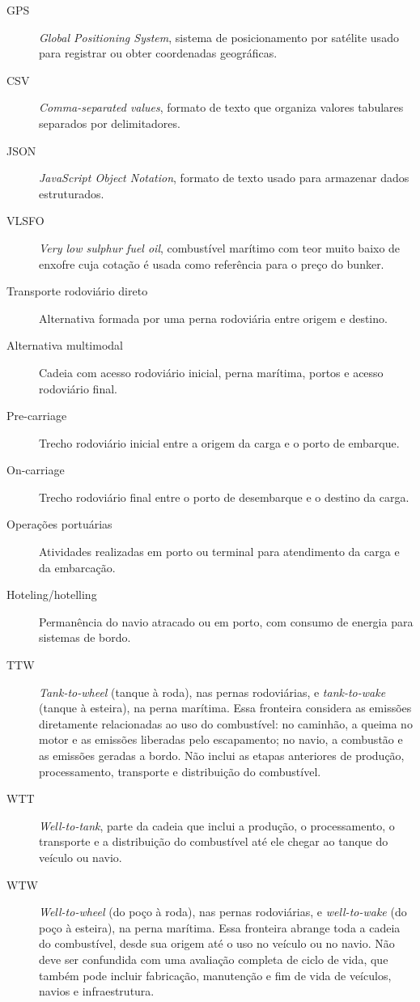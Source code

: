 \documentclass[12pt,a4paper,oneside]{report}
\newcommand{\ttw}{TTW}
\newcommand{\wtw}{WTW}
\begin{document}
\begin{description}
  \item[GPS] \textit{Global Positioning System}, sistema de posicionamento por satélite usado para registrar ou obter coordenadas geográficas.
  \item[CSV] \textit{Comma-separated values}, formato de texto que organiza valores tabulares separados por delimitadores.
  \item[JSON] \textit{JavaScript Object Notation}, formato de texto usado para armazenar dados estruturados.
  \item[VLSFO] \textit{Very low sulphur fuel oil}, combustível marítimo com teor muito baixo de enxofre cuja cotação é usada como referência para o preço do bunker.
  \item[Transporte rodoviário direto] Alternativa formada por uma perna rodoviária entre origem e destino.
  \item[Alternativa multimodal] Cadeia com acesso rodoviário inicial, perna marítima, portos e acesso rodoviário final.
  \item[Pre-carriage] Trecho rodoviário inicial entre a origem da carga e o porto de embarque.
  \item[On-carriage] Trecho rodoviário final entre o porto de desembarque e o destino da carga.
  \item[Operações portuárias] Atividades realizadas em porto ou terminal para atendimento da carga e da embarcação.
  \item[Hoteling/hotelling] Permanência do navio atracado ou em porto, com consumo de energia para sistemas de bordo.
  \item[\ttw{}] \textit{Tank-to-wheel} (tanque à roda), nas pernas rodoviárias, e \textit{tank-to-wake} (tanque à esteira), na perna marítima. Essa fronteira considera as emissões diretamente relacionadas ao uso do combustível: no caminhão, a queima no motor e as emissões liberadas pelo escapamento; no navio, a combustão e as emissões geradas a bordo. Não inclui as etapas anteriores de produção, processamento, transporte e distribuição do combustível.
  \item[WTT] \textit{Well-to-tank}, parte da cadeia que inclui a produção, o processamento, o transporte e a distribuição do combustível até ele chegar ao tanque do veículo ou navio.
  \item[\wtw{}] \textit{Well-to-wheel} (do poço à roda), nas pernas rodoviárias, e \textit{well-to-wake} (do poço à esteira), na perna marítima. Essa fronteira abrange toda a cadeia do combustível, desde sua origem até o uso no veículo ou no navio. Não deve ser confundida com uma avaliação completa de ciclo de vida, que também pode incluir fabricação, manutenção e fim de vida de veículos, navios e infraestrutura.

\end{description}
\end{document}
